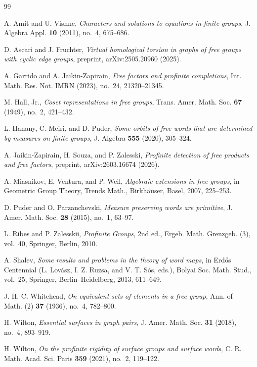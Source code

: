 \documentclass[11pt]{amsart}
\theoremstyle{plain}
\theoremstyle{definition}
\begin{document}
\begin{thebibliography}{99}


 A. Amit and U. Vishne,
\emph{Characters and solutions to equations in finite groups},
J. Algebra Appl. \textbf{10} (2011), no.~4, 675--686.

 D. Ascari and J. Fruchter,
\emph{Virtual homological torsion in graphs of free groups with cyclic
edge groups}, preprint, arXiv:2505.20960 (2025).

 A. Garrido and A. Jaikin-Zapirain,
\emph{Free factors and profinite completions},
Int. Math. Res. Not. IMRN (2023), no.~24, 21320--21345.

 M. Hall, Jr.,
\emph{Coset representations in free groups},
Trans. Amer. Math. Soc. \textbf{67} (1949), no.~2, 421--432.

 L. Hanany, C. Meiri, and D. Puder,
\emph{Some orbits of free words that are determined by measures on
finite groups}, J. Algebra \textbf{555} (2020), 305--324.

 A. Jaikin-Zapirain, H. Souza, and P. Zalesski,
\emph{Profinite detection of free products and free factors},
preprint, arXiv:2603.16674 (2026).

 A. Miasnikov, E. Ventura, and P. Weil,
\emph{Algebraic extensions in free groups},
in Geometric Group Theory, Trends Math.,
Birkh\"auser, Basel, 2007, 225--253.

 D. Puder and O. Parzanchevski,
\emph{Measure preserving words are primitive},
J. Amer. Math. Soc. \textbf{28} (2015), no.~1, 63--97.

 L. Ribes and P. Zalesskii,
\emph{Profinite Groups}, 2nd ed.,
Ergeb. Math. Grenzgeb. (3), vol.~40,
Springer, Berlin, 2010.

 A. Shalev,
\emph{Some results and problems in the theory of word maps},
in Erd\H{o}s Centennial
(L. Lov\'asz, I. Z. Ruzsa, and V. T. S\'os, eds.),
Bolyai Soc. Math. Stud., vol.~25,
Springer, Berlin--Heidelberg, 2013, 611--649.

 J. H. C. Whitehead,
\emph{On equivalent sets of elements in a free group},
Ann. of Math. (2) \textbf{37} (1936), no.~4, 782--800.

 H. Wilton,
\emph{Essential surfaces in graph pairs},
J. Amer. Math. Soc. \textbf{31} (2018), no.~4, 893--919.


 H. Wilton,
\emph{On the profinite rigidity of surface groups and surface words},
C. R. Math. Acad. Sci. Paris \textbf{359} (2021), no.~2, 119--122.

\end{thebibliography}
\end{document}
